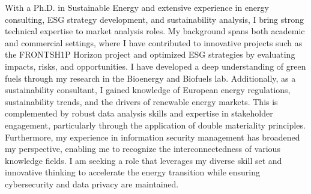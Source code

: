

\begin{cvparagraph}

    With a Ph.D. in Sustainable Energy and extensive experience in energy consulting, ESG strategy development, and sustainability analysis, I bring strong technical expertise to market analysis roles. My background spans both academic and commercial settings, where I have contributed to innovative projects such as the FRONTSH1P Horizon project and optimized ESG strategies by evaluating impacts, risks, and opportunities. I have developed a deep understanding of green fuels through my research in the Bioenergy and Biofuels lab. Additionally, as a sustainability consultant, I gained knowledge of European energy regulations, sustainability trends, and the drivers of renewable energy markets. This is complemented by robust data analysis skills and expertise in stakeholder engagement, particularly through the application of double materiality principles. Furthermore, my experience in information security management has broadened my perspective, enabling me to recognize the interconnectedness of various knowledge fields. I am seeking a role that leverages my diverse skill set and innovative thinking to accelerate the energy transition while ensuring cybersecurity and data privacy are maintained.
\end{cvparagraph}
